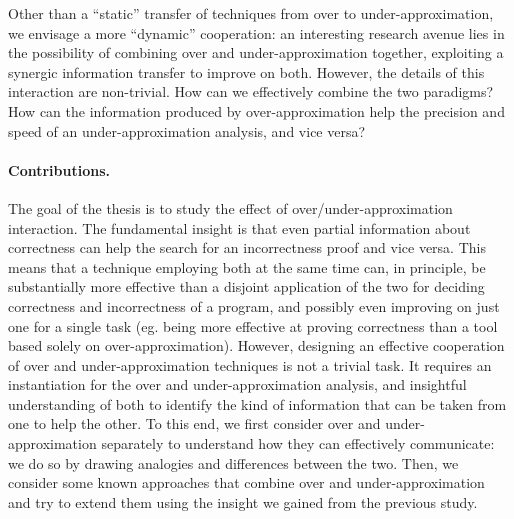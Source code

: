 Other than a ``static'' transfer of techniques from over to under-approximation, we envisage a more ``dynamic'' cooperation: an interesting research avenue lies in the possibility of combining over and under-approximation together, exploiting a synergic information transfer to improve on both. However, the details of this interaction are non-trivial. How can we effectively combine the two paradigms? How can the information produced by over-approximation help the precision and speed of an under-approximation analysis, and vice versa?

\paragraph*{Contributions.}
The goal of the thesis is to study the effect of over/under-approximation interaction.
The fundamental insight is that even partial information about correctness can help the search for an incorrectness proof and vice versa. This means that a technique employing both at the same time can, in principle, be substantially more effective than a disjoint application of the two for deciding correctness and incorrectness of a program, and possibly even improving on just one for a single task (eg. being more effective at proving correctness than a tool based solely on over-approximation).
However, designing an effective cooperation of over and under-approximation techniques is not a trivial task. It requires an instantiation for the over and under-approximation analysis, and insightful understanding of both to identify the kind of information that can be taken from one to help the other.
To this end, we first consider over and under-approximation separately to understand how they can effectively communicate: we do so by drawing analogies and differences between the two. Then, we consider some known approaches that combine over and under-approximation and try to extend them using the insight we gained from the previous study.

